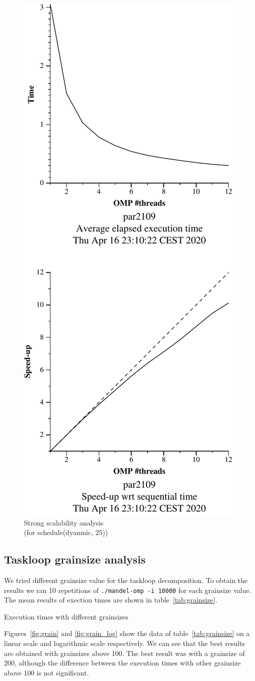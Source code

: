 \begin{figure}[H]
    \centering
    \includegraphics[width=0.35\linewidth]{plots/v11-crop.pdf}
    \caption{Strong scalability analysis \\ (for schedule(dyanmic, 25))}
    \label{fig:ssa_v7} 
\end{figure}

\pagebreak
\subsection{Taskloop grainsize analysis}

We tried different grainsize value for the taskloop decomposition. To obtain the results we ran
10 repetitions of \texttt{./mandel-omp -i 10000} for each grainsize value. The mean results of
exection times are shown in table~\ref{tab:grainsize}.

\begin{table}[H]
    \caption{Execution times with different grainsizes}%
    \label{tab:grainsize}
    \begin{center}
    
    \end{center}
\end{table}

Figures~\ref{fig:grain} and \ref{fig:grain_log} show the data of table~\ref{tab:grainsize} on a linear scale and logarithmic
scale respectively. We can see that the best results are obtained with grainsizes above 100. The best result was
with a grainsize of 200, although the difference between the execution times with other grainsize above 100 is not
significant.

